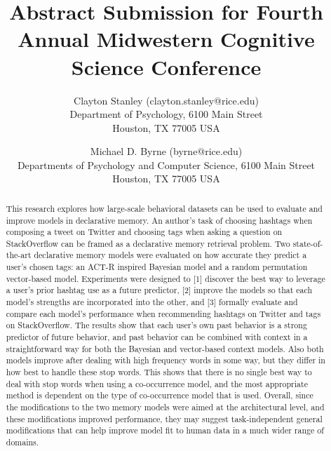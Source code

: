 \documentclass[english]{article}
\title{Abstract Submission for Fourth Annual Midwestern Cognitive Science Conference}
\author{Clayton Stanley (clayton.stanley@rice.edu) \\
  Department of Psychology, 6100 Main Street \\
  Houston, TX 77005 USA 
  \and Michael D. Byrne (byrne@rice.edu) \\
  Departments of Psychology and Computer Science, 6100 Main Street \\
  Houston, TX 77005 USA \\
}
\begin{document}
\maketitle

\begin{abstract}
  This research explores how large-scale behavioral datasets can be used to evaluate and improve models in declarative memory.
  An author's task of choosing hashtags when composing a tweet on Twitter and choosing tags when asking a question on StackOverflow can be framed as a declarative memory retrieval problem.
  Two state-of-the-art declarative memory models were evaluated on how accurate they predict a user's chosen tags: an ACT-R inspired Bayesian model and a random permutation vector-based model.
  Experiments were designed to
  [1] discover the best way to leverage a user's prior hashtag use as a future predictor,
  [2] improve the models so that each model's strengths are incorporated into the other,
  and [3] formally evaluate and compare each model's performance when recommending hashtags on Twitter and tags on StackOverflow.
  The results show that each user's own past behavior is a strong predictor of future behavior, and past behavior can be combined with context in a straightforward way for both the Bayesian and vector-based context models.
  Also both models improve after dealing with high frequency words in some way, but they differ in how best to handle these stop words.
  This shows that there is no single best way to deal with stop words when using a co-occurrence model, and the most appropriate method is dependent on the type of co-occurrence model that is used.
  Overall, since the modifications to the two memory models were aimed at the architectural level, and these modifications improved performance,
  they may suggest task-independent general modifications that can help improve model fit to human data in a much wider range of domains.
\end{abstract}
\end{document}
